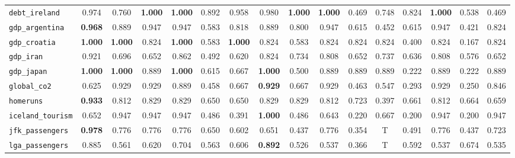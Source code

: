 \begin{table*}[h!]
\begin{adjustbox}{width=\textwidth}
\begin{tabular}{l|c|cccccccccccccc}
    \verb+debt_ireland+ & \cellcolor{SeaGreen!01}0.974 & 0.760 & \textbf{1.000} & \textbf{1.000} & 0.892 & 0.958 & 0.980 & \textbf{1.000} & \textbf{1.000} & 0.469 & 0.748 & 0.824 & \textbf{1.000} & 0.538 & 0.469\\
    
    \verb+gdp_argentina+ & \cellcolor{SeaGreen!02}\textbf{0.968} & 0.889 & 0.947 & 0.947 & 0.583 & 0.818 & 0.889 & 0.800 & 0.947 & 0.615 & 0.452 & 0.615 & 0.947 & 0.421 & 0.824\\
    
    \verb+gdp_croatia+ & \textbf{1.000} & \textbf{1.000} & 0.824 & \textbf{1.000} & 0.583 & \textbf{1.000} & 0.824 & 0.583 & 0.824 & 0.824 & 0.824 & 0.400 & 0.824 & 0.167 & 0.824\\
    
    \verb+gdp_iran+ & \cellcolor{SeaGreen!06}0.921 & 0.696 & 0.652 & 0.862 & 0.492 & 0.620 & 0.824 & 0.734 & 0.808 & 0.652 & 0.737 & 0.636 & 0.808 & 0.576 & 0.652\\
    
    \verb+gdp_japan+ & \textbf{1.000} & \textbf{1.000} & 0.889 & \textbf{1.000} & 0.615 & 0.667 & \textbf{1.000} & 0.500 & 0.889 & 0.889 & 0.889 & 0.222 & 0.889 & 0.222 & 0.889\\
    
    \verb+global_co2+ & \cellcolor{SeaGreen!30}0.625 & 0.929 & 0.929 & 0.889 & 0.458 & 0.667 & \textbf{0.929} & 0.667 & 0.929 & 0.463 & 0.547 & 0.293 & 0.929 & 0.250 & 0.846\\
    
    \verb+homeruns+ & \cellcolor{blue!10}\textbf{0.933} & 0.812 & 0.829 & 0.829 & 0.650 & 0.650 & 0.829 & 0.829 & 0.812 & 0.723 & 0.397 & 0.661 & 0.812 & 0.664 & 0.659\\
    
    \verb+iceland_tourism+ & \cellcolor{SeaGreen!40}0.652 & 0.947 & 0.947 & 0.947 & 0.486 & 0.391 & \textbf{1.000} & 0.486 & 0.643 & 0.220 & 0.667 & 0.200 & 0.947 & 0.200 & 0.947\\
    
    \verb+jfk_passengers+ & \cellcolor{blue!20}\textbf{0.978} & 0.776 & 0.776 & 0.776 & 0.650 & 0.602 & 0.651 & 0.437 & 0.776 & 0.354 & T & 0.491 & 0.776 & 0.437 & 0.723\\
    
    \verb+lga_passengers+ & \cellcolor{SeaGreen!01}0.885 & 0.561 & 0.620 & 0.704 & 0.563 & 0.606 & \textbf{0.892} & 0.526 & 0.537 & 0.366 & T & 0.592 & 0.537 & 0.674 & 0.535\\
    

\end{tabular}
\end{adjustbox}
\end{table*}
